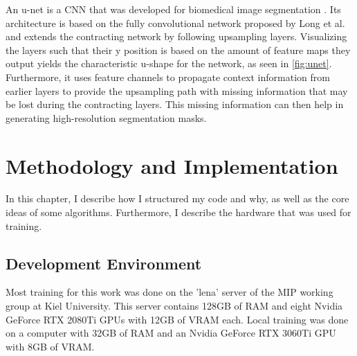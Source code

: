 \documentclass[10pt]{book}
\newcommand{\figureref}[1]{\autoref{#1}}
\begin{document}
An u-net is a \ac{CNN} that was developed for biomedical image segmentation \cite{DBLP:journals/corr/RonnebergerFB15}. Its architecture is based on the fully convolutional network proposed by Long et al. \cite{DBLP:journals/corr/LongSD14} and extends the contracting network by following upsampling layers. Visualizing the layers such that their y position is based on the amount of feature maps they output yields the characteristic u-shape for the network, as seen in \figureref{fig:unet}. Furthermore, it uses feature channels to propagate context information from earlier layers to provide the upsampling path with missing information that may be lost during the contracting layers. This missing information can then help in generating high-resolution segmentation masks.

\chapter{Methodology and Implementation}
\label{chap:implement}

In this chapter, I describe how I structured my code and why, as well as the core ideas of some algorithms. Furthermore, I describe the hardware that was used for training.





\section{Development Environment}

Most training for this work was done on the 'lena' server of the \ac{MIP} working group at Kiel University. This server contains 128GB of RAM and eight Nvidia GeForce RTX 2080Ti \acp{GPU} with 12GB of VRAM each. Local training was done on a computer with 32GB of RAM and an Nvidia GeForce RTX 3060Ti \ac{GPU} with 8GB of VRAM.
\end{document}
